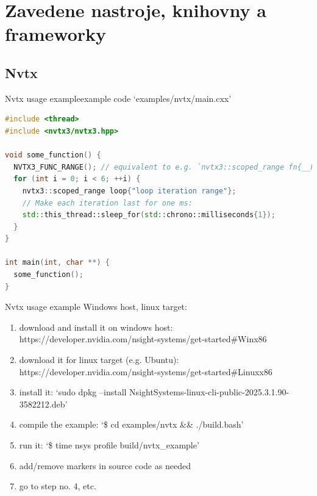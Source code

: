 \documentclass[aspectratio=169]{beamer}
\begin{document}
\section{Zavedene nastroje, knihovny a frameworky}


\subsection{Nvtx}

\begin{frame}[fragile]{Nvtx usage example}{example code `examples/nvtx/main.cxx'}
    
    \begin{lstlisting}[language=C++]
#include <thread>
#include <nvtx3/nvtx3.hpp>

void some_function() {
  NVTX3_FUNC_RANGE(); // equivalent to e.g. `nvtx3::scoped_range fn{__FUNCTION__};'
  for (int i = 0; i < 6; ++i) {
    nvtx3::scoped_range loop{"loop iteration range"};
    // Make each iteration last for one ms:
    std::this_thread::sleep_for(std::chrono::milliseconds{1});
  }
}

int main(int, char **) {
  some_function();
}
    \end{lstlisting}

\end{frame}

\begin{frame}{Nvtx usage example}
    Windows host, linux target:

    \begin{enumerate}
        \item download and install it on windows host: https://developer.nvidia.com/nsight-systems/get-started\#Winx86
        \item download it for linux target (e.g. Ubuntu): https://developer.nvidia.com/nsight-systems/get-started\#Linuxx86
        \item install it: `sudo dpkg --install NsightSystems-linux-cli-public-2025.3.1.90-3582212.deb'
        \item compile the example: `\$ cd examples/nvtx \&\& ./build.bash'
        \item run it: `\$ time nsys profile build/nvtx\_example'
        \item add/remove markers in source code as needed
        \item go to step no. 4, etc.
    \end{enumerate}

\end{frame}
\end{document}

